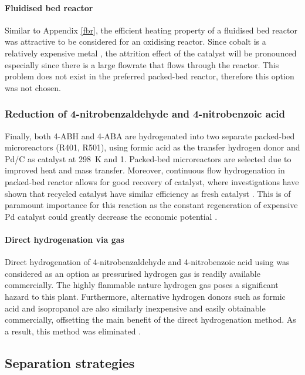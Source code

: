 \paragraph{Fluidised bed reactor}
Similar to Appendix \ref{fbr}, the efficient heating property of a fluidised bed reactor was attractive to be considered for an oxidising reactor. Since cobalt is a relatively expensive metal \cite{saib_fundamental_2014}, the attrition effect of the catalyst will be pronounced especially since there is a large flowrate that flows through the reactor. This problem does not exist in the preferred packed-bed reactor, therefore this option was not chosen.

\subsubsection{Reduction of 4-nitrobenzaldehyde and 4-nitrobenzoic acid}

Finally, both 4-ABH and 4-ABA are hydrogenated into two separate packed-bed microreactors (R401, R501), using formic acid as the transfer hydrogen donor and Pd/C as catalyst at \SI{298}{\K} and \SI{1}{\atm}. Packed-bed microreactors are selected due to improved heat and mass transfer. Moreover, continuous flow hydrogenation in packed-bed reactor allows for good recovery of catalyst, where investigations have shown that recycled catalyst have similar efficiency as fresh catalyst \cite{rahman_fast_2020}. This is of paramount importance for this reaction as the constant regeneration of expensive Pd catalyst could greatly decrease the economic potential \cite{rahman_fast_2020}. 


\paragraph{Direct hydrogenation via  gas}

Direct hydrogenation of 4-nitrobenzaldehyde and 4-nitrobenzoic acid using  was considered as an option as pressurised hydrogen gas is readily available commercially. The highly flammable nature hydrogen gas poses a significant hazard to this plant. Furthermore, alternative hydrogen donors such as formic acid and isopropanol are also similarly inexpensive and easily obtainable commercially, offsetting the main benefit of the direct hydrogenation method. As a result, this method was eliminated \cite{wang_golden_nodate}. 






\subsection{Separation strategies}


